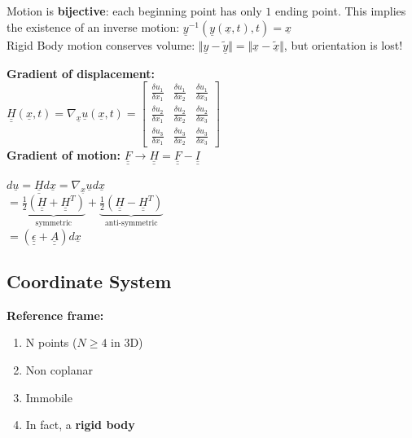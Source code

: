 Motion is \textbf{bijective}: each beginning point has only $1$ ending point. This implies the existence of an inverse motion: $ \underline{y}^{-1} (\underline{y} (\underline{x},t),t) = \underline{x}$ \\

Rigid Body motion conserves volume: $ \Vert  \underline{y} - \underline{\tilde{y}} \Vert = \Vert  \underline{x} - \underline{\tilde{x}} \Vert$, but orientation is lost!



\textbf{Gradient of displacement:} \\
$\underline{\underline{H}}(\underline{x},t) = \nabla_{\underline{x}} \underline{u} (\underline{x},t) = \left[\begin{smallmatrix} \frac{\delta u_1}{\delta x_1} & \frac{\delta u_1}{\delta x_2} & \frac{\delta u_1}{\delta x_3} \\ \frac{\delta u_2}{\delta x_1} & \frac{\delta u_2}{\delta x_2} & \frac{\delta u_2}{\delta x_3} \\ \frac{\delta u_3}{\delta x_1} & \frac{\delta u_3}{\delta x_2} & \frac{\delta u_3}{\delta x_3} \end{smallmatrix}\right] $\\
\textbf{Gradient of motion:}  $ \underline{\underline{F}} \rightarrow \underline{\underline{H}} = \underline{\underline{F}} - \underline{\underline{I}} $


$d \underline{u} = \underline{\underline{H}} d \underline{x} = \nabla_{\underline{x}} \underline{u} d \underline{x}$ \\
$= \underbrace{\frac{1}{2} (\underline{\underline{H}} + \underline{\underline{H}}^T)}_{\text{symmetric}} +  \underbrace{\frac{1}{2} (\underline{\underline{H}} - \underline{\underline{H}}^T)}_{\text{anti-symmetric}} $ \\
$= (\underline{\underline{\epsilon}} + \underline{\underline{A}}) d \underline{x} $


\subsection*{Coordinate System}
\smallskip

\textbf{Reference frame:} \begin{enumerate}
\item N points ($ N \geqslant 4 $ in 3D)
\item Non coplanar
\item Immobile
\item In fact, a \textbf{rigid body}
\end{enumerate}


